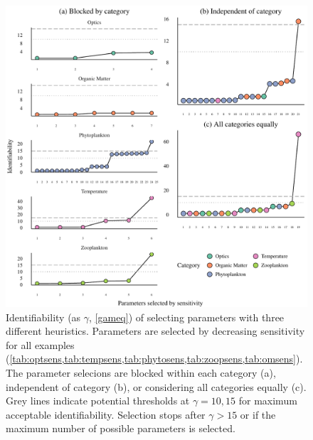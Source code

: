 \documentclass[letterpaper,12pt,oneside]{article}\usepackage[]{graphicx}\usepackage[]{color}
\begin{document}
\begin{figure}[!ht]

{\centering \includegraphics[width=\textwidth]{figs/heurist-1} 

}

\caption{Identifiability (as $\gamma$, \cref{gameq}) of selecting parameters with three different heuristics. Parameters are selected by decreasing sensitivity for all examples (\cref{tab:optsens,tab:tempsens,tab:phytosens,tab:zoopsens,tab:omsens}). The parameter selecions are blocked within each category (a), independent of category (b), or considering all categories equally (c). Grey lines indicate potential thresholds at $\gamma = 10, 15$ for maximum acceptable identifiability. Selection stops after $\gamma > 15$ or if the maximum number of possible parameters is selected.}\label{fig:heurist}
\end{figure}
\end{document}
